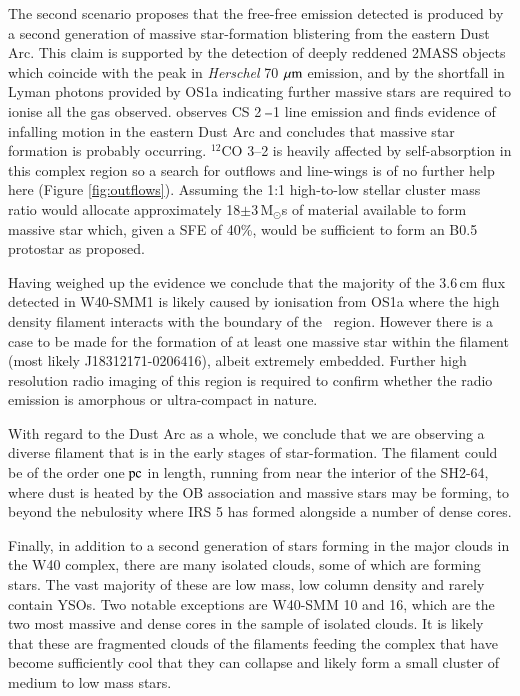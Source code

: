 The second scenario proposes that the free-free emission detected is produced by a second 
generation of massive star-formation blistering from the eastern Dust Arc. This claim is supported 
by the detection of deeply reddened 2MASS objects which coincide with the peak in \emph{Herschel} 
70\,$\,\mu\rm{m}$ emission, and by the shortfall in Lyman photons provided by OS1a indicating further 
massive stars are required to ionise all the gas observed. \cite{Pirogov:2013ys} observes CS 2$\hbox{ --}$1 
line emission and finds evidence of infalling motion in the eastern Dust Arc and concludes that massive 
star formation is probably occurring. $^{12}$CO 3\hbox{--}2 is heavily affected by self-absorption in this 
complex region so a search for outflows and line-wings is of no further help here (Figure \ref{fig:outflows}). 
Assuming the 1:1 high-to-low stellar cluster mass ratio would allocate approximately 18$\pm$3\,M$_{\odot}$s 
of material available to form massive star which, given a SFE of 40\%, would be sufficient to form an 
B0.5 protostar as proposed.

Having weighed up the evidence we conclude that the majority of the 3.6\,cm flux detected in W40-SMM1 
is likely caused by ionisation from OS1a where the high density filament interacts with the boundary of the 
\HII\ region. However there is a case to be made for the formation of at least one massive star within the 
filament (most likely J18312171-0206416), albeit extremely embedded. Further high resolution radio 
imaging of this region is required to confirm whether the radio emission is amorphous or ultra-compact 
in nature. 

With regard to the Dust Arc as a whole, we conclude that we are observing a diverse filament 
that is in the early stages of star-formation. The filament could be of the order one$\hbox{ pc}$ in 
length, running from near the interior of the SH2-64, where dust is heated by the OB association 
and massive stars may be forming, to beyond the nebulosity where IRS 5 has formed alongside 
a number of dense cores. 

Finally, in addition to a second generation of stars forming in the major clouds in the W40 complex, 
there are many isolated clouds, some of which are forming stars. The vast majority of these are low 
mass, low column density and rarely contain YSOs. Two notable exceptions are W40-SMM 10 and 
16, which are the two most massive and dense cores in the sample of isolated clouds. It is likely that 
these are fragmented clouds of the filaments feeding the complex that have become sufficiently cool 
that they can collapse and likely form a small cluster of medium to low mass stars.   

